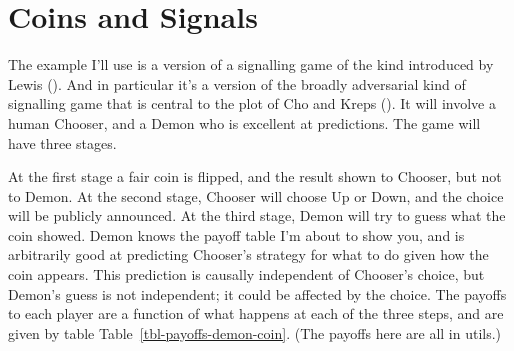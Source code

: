 \documentclass[
  10pt,
  letterpaper,
  DIV=11,
  numbers=noendperiod,
  twoside]{scrartcl}
\begin{document}
\section{Coins and Signals}\label{sec-coinssignals}

The example I'll use is a version of a signalling game of the kind
introduced by Lewis (). And in particular
it's a version of the broadly adversarial kind of signalling game that
is central to the plot of Cho and Kreps
(). It will involve a human Chooser,
and a Demon who is excellent at predictions. The game will have three
stages.

At the first stage a fair coin is flipped, and the result shown to
Chooser, but not to Demon. At the second stage, Chooser will choose Up
or Down, and the choice will be publicly announced. At the third stage,
Demon will try to guess what the coin showed. Demon knows the payoff
table I'm about to show you, and is arbitrarily good at predicting
Chooser's strategy for what to do given how the coin appears. This
prediction is causally independent of Chooser's choice, but Demon's
guess is not independent; it could be affected by the choice. The
payoffs to each player are a function of what happens at each of the
three steps, and are given by table Table~\ref{tbl-payoffs-demon-coin}.
(The payoffs here are all in utils.)
\end{document}
